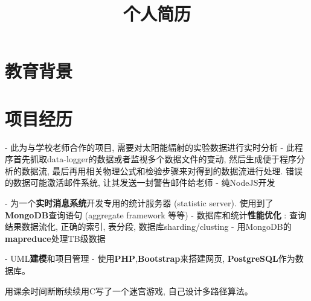 \documentclass[11pt,a4paper]{moderncv}
\title{\normalsize 个人简历}
\begin{document}
\maketitle

\section{教育背景}


\section{项目经历}

{
- 此为与学校老师合作的项目, 需要对太阳能辐射的实验数据进行实时分析\newline
- 此程序首先抓取data-logger的数据或者监视多个数据文件的变动, 然后生成便于程序分析的数据流, 最后再用相关物理公式和检验步骤来对得到的数据流进行处理. 错误的数据可能激活邮件系统, 让其发送一封警告邮件给老师\newline
- 纯NodeJS开发
}

\vspace*{0.2\baselineskip}
{
- 为一个\textbf{实时消息系统}开发专用的统计服务器 (statistic server). 使用到了\textbf{MongoDB}查询语句 (aggregate framework 等等)\newline
- 数据库和统计\textbf{性能优化} : 查询结果数据流化, 正确的索引, 表分段, 数据库sharding/clusting\newline
- 用MongoDB的\textbf{mapreduce}处理TB级数据
}

\vspace*{0.2\baselineskip}
{
- UML\textbf{建模}和项目管理\newline
- 使用\textbf{PHP},\textbf{Bootstrap}来搭建网页, \textbf{PostgreSQL}作为数据库。
}

\vspace*{0.2\baselineskip}
{用课余时间断断续续用C写了一个迷宫游戏, 自己设计多路径算法。}
\end{document}
